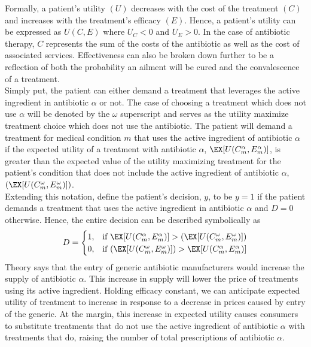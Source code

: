 \indent Formally, a patient's utility $(U)$ decreases with the cost of the treatment $(C)$ and increases with the treatment's efficacy $(E)$. Hence, a patient's utility can be expressed as $U(C,E)$ where $U_C < 0$ and $U_E > 0$. In the case of antibiotic therapy, $C$ represents the sum of the costs of the antibiotic as well as the cost of associated services. Effectiveness can also be broken down further to be a reflection of both the probability an ailment will be cured and the convalescence of a treatment.\\
\indent Simply put, the patient can either demand a treatment that leverages the active ingredient in antibiotic $\alpha$ or not. The case of choosing a treatment which does not use $\alpha$ will be denoted by the $\omega$ superscript and serves as the utility maximize treatment choice which does not use the antibiotic. The patient will demand a treatment for medical condition $m$ that uses the active ingredient of antibiotic $\alpha$ if the expected utility of a treatment with antibiotic $\alpha$, $\EX[U(C^\alpha_m,E^\alpha_m)]$, is greater than the expected value of the utility maximizing treatment for the patient's condition that does not include the active ingredient of antibiotic $\alpha$, $(\EX[U(C^\omega_m,E^\omega_m)])$.\\
Extending this notation, define the patient's decision, $y$, to be $y=1$ if the patient demands a treatment that uses the active ingredient in antibiotic $\alpha$ and $D=0$ otherwise. Hence, the entire decision can be described symbolically as
\begin{eqnarray}
  D =
  \begin{cases}
    1, & \text{if }\EX[U(C^\alpha_m,E^\alpha_m)] > (\EX[U(C^\omega_m,E^\omega_m)]) \\
    0, & \text{if }(\EX[U(C^\omega_m,E^\omega_m)]) > \EX[U(C^\alpha_m,E^\alpha_m)] \\
  \end{cases}
\end{eqnarray}
\indent Theory says that the entry of generic antibiotic manufacturers would increase the supply of antibiotic $\alpha$. This increase in supply will lower the price of treatments using its active ingredient. Holding efficacy constant, we can anticipate expected utility of treatment to increase in response to a decrease in prices caused by entry of the generic. At the margin, this increase in expected utility causes consumers to substitute treatments that do not use the active ingredient of antibiotic $\alpha$ with treatments that do, raising the number of total prescriptions of antibiotic $\alpha$.
